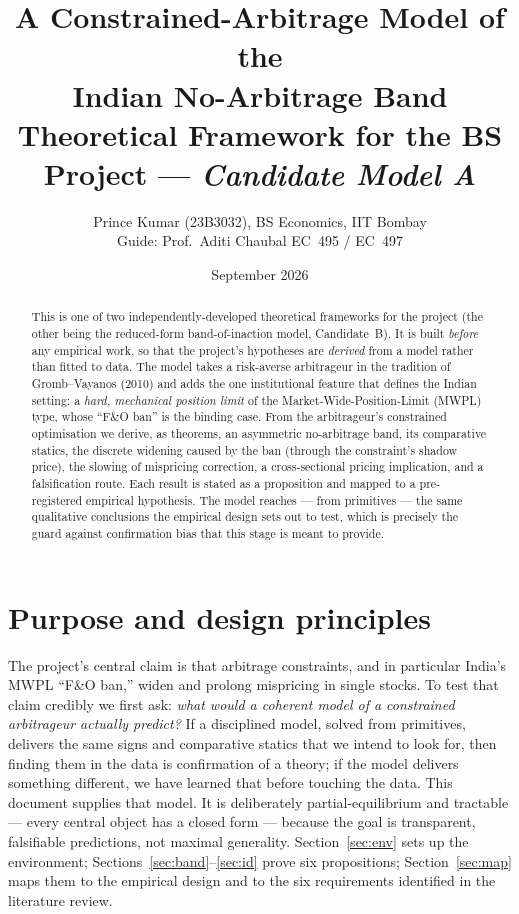 \documentclass[11pt,a4paper]{article}
\title{\vspace{-1.2cm}\color{accent}\bfseries A Constrained-Arbitrage Model of the\\ Indian No-Arbitrage Band\\[0.25cm]
\large\mdseries\color{black} Theoretical Framework for the BS Project --- \emph{Candidate Model A}}
\author{Prince Kumar (23B3032), BS Economics, IIT Bombay\\ \small Guide: Prof.\ Aditi Chaubal \quad\textbar\quad EC~495 / EC~497}
\date{September 2026}
\theoremstyle{plain}
\theoremstyle{definition}
\theoremstyle{remark}
\begin{document}
\maketitle
\thispagestyle{empty}

\begin{abstract}
\noindent This is one of two independently-developed theoretical frameworks for the project (the other being the reduced-form band-of-inaction model, Candidate~B). It is built \emph{before} any empirical work, so that the project's hypotheses are \emph{derived} from a model rather than fitted to data. The model takes a risk-averse arbitrageur in the tradition of Gromb--Vayanos (2010) and adds the one institutional feature that defines the Indian setting: a \emph{hard, mechanical position limit} of the Market-Wide-Position-Limit (MWPL) type, whose ``F\&O ban'' is the binding case. From the arbitrageur's constrained optimisation we derive, as theorems, an asymmetric no-arbitrage band, its comparative statics, the discrete widening caused by the ban (through the constraint's shadow price), the slowing of mispricing correction, a cross-sectional pricing implication, and a falsification route. Each result is stated as a proposition and mapped to a pre-registered empirical hypothesis. The model reaches --- from primitives --- the same qualitative conclusions the empirical design sets out to test, which is precisely the guard against confirmation bias that this stage is meant to provide.
\end{abstract}

\section{Purpose and design principles}
The project's central claim is that arbitrage constraints, and in particular India's MWPL ``F\&O ban,'' widen and prolong mispricing in single stocks. To test that claim credibly we first ask: \emph{what would a coherent model of a constrained arbitrageur actually predict?} If a disciplined model, solved from primitives, delivers the same signs and comparative statics that we intend to look for, then finding them in the data is confirmation of a theory; if the model delivers something different, we have learned that before touching the data. This document supplies that model. It is deliberately partial-equilibrium and tractable --- every central object has a closed form --- because the goal is transparent, falsifiable predictions, not maximal generality. Section~\ref{sec:env} sets up the environment; Sections~\ref{sec:band}--\ref{sec:id} prove six propositions; Section~\ref{sec:map} maps them to the empirical design and to the six requirements identified in the literature review.
\end{document}
